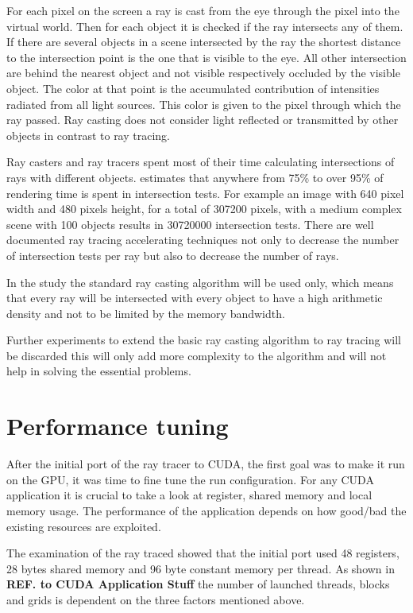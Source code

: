 For each pixel on the screen a ray is cast from the eye through the pixel into
the virtual world. Then for each object it is checked if the ray intersects any
of them. If there are several objects in a scene intersected by the ray the
shortest distance to the intersection point is the one that is visible to the
eye. All other intersection are behind the nearest object and not visible
respectively occluded by the visible object. The color at that point is the
accumulated contribution of intensities radiated from all light sources. This
color is given to the pixel through which the ray passed. Ray casting does not
consider light reflected or transmitted by other objects in contrast to ray
tracing.

Ray casters and ray tracers spent most of their time calculating intersections
of rays with different objects. \citeauthor{citeulike:3770900}
\citep{citeulike:3770900} estimates that anywhere from 75\% to over 95\% of
rendering time is spent in intersection tests. For example an image with 640
pixel width and 480 pixels height, for a total of 307200 pixels, with a medium
complex scene with 100 objects results in 30720000 intersection tests. There are
well documented ray tracing accelerating techniques not only to decrease the
number of intersection tests per ray but also to decrease the number of rays.

In the study the standard ray casting algorithm will be used only, which means
that every ray will be intersected with every object to have a high arithmetic
density and not to be limited by the memory bandwidth.

Further experiments to extend the basic ray casting algorithm to ray tracing 
will be discarded this will only add more complexity to the algorithm and will
not help in solving the essential problems. 

\section{Performance tuning} %
\label{sec:performance_tuning}

After the initial port of the ray tracer to \gls{CUDA}, the first goal was to 
make it run on the \gls{GPU}, it was time to fine tune the run configuration. 
For any \gls{CUDA} application it is crucial to take a look at register, shared 
memory and local memory usage. The performance of the application  depends on
how good/bad the existing resources are exploited.

The examination of the ray traced showed that the initial port used 48
registers, 28 bytes shared memory and 96 byte constant memory per thread. As
shown in \textbf{REF. to \gls{CUDA} Application Stuff} the number of launched threads,
blocks and grids is dependent on the three factors mentioned above.

